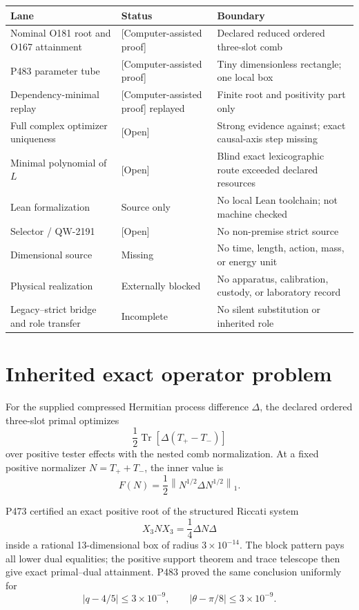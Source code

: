 \documentclass[11pt,a4paper,openany]{report}
\newcommand{\statusCAP}{\textcolor{fingreen}{[Computer-assisted proof]}}
\newcommand{\statusOpen}{\textcolor{finorange}{[Open]}}
\begin{document}
\begin{center}\small
\begin{longtable}{@{}p{}p{}p{}@{}}
\toprule
\textbf{Lane} & \textbf{Status} & \textbf{Boundary}\\ \midrule\endhead
Nominal O181 root and O167 attainment & \statusCAP{} & Declared reduced ordered three-slot comb\\
P483 parameter tube & \statusCAP{} & Tiny dimensionless rectangle; one local box\\
Dependency-minimal replay & \statusCAP{} replayed & Finite root and positivity part only\\
Full complex optimizer uniqueness & \statusOpen{} & Strong evidence against; exact causal-axis step missing\\
Minimal polynomial of \(L\) & \statusOpen{} & Blind exact lexicographic route exceeded declared resources\\
Lean formalization & Source only & No local Lean toolchain; not machine checked\\
Selector / QW-2191 & \statusOpen{} & No non-premise strict source\\
Dimensional source & Missing & No time, length, action, mass, or energy unit\\
Physical realization & Externally blocked & No apparatus, calibration, custody, or laboratory record\\
Legacy--strict bridge and role transfer & Incomplete & No silent substitution or inherited role\\
\bottomrule
\end{longtable}
\end{center}

\chapter{Inherited exact operator problem}

For the supplied compressed Hermitian process difference \(\Delta\), the
declared ordered three-slot primal optimizes
\[
 \frac12\operatorname{Tr}[\Delta(T_+-T_-)]
\]
over positive tester effects with the nested comb normalization. At a fixed
positive normalizer \(N=T_++T_-\), the inner value is
\[
 F(N)=\frac12\left\|N^{1/2}\Delta N^{1/2}\right\|_1.
\]

P473 certified an exact positive root of the structured Riccati system
\[
 X_3NX_3=\frac14\Delta N\Delta                                     \tag{3.1}
\]
inside a rational 13-dimensional box of radius \(3\times10^{-14}\).
The block pattern pays all lower dual equalities; the positive support theorem
and trace telescope then give exact primal--dual attainment. P483 proved the
same conclusion uniformly for
\[
 |q-4/5|\le3\times10^{-9},\qquad
 |\theta-\pi/8|\le3\times10^{-9}.
\]
\end{document}
